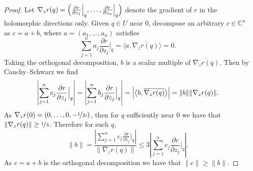 \documentclass[12pt,openany]{book}
\newcommand{\blinnprod}[2]{\bigl\langle #1 , #2 \bigr\rangle}
\newcommand{\snorm}[1]{\lVert {#1} \rVert}
\newcommand{\Babs}[1]{\Bigl\lvert {#1} \Bigr\rvert}
\newcommand{\abs}[1]{\left\lvert {#1} \right\rvert}
\newcommand{\C}{{\mathbb{C}}}
\theoremstyle{plain}
\theoremstyle{remark}
\theoremstyle{definition}
\theoremstyle{exercise}
\theoremstyle{example}
\begin{document}
\begin{proof}
Let $\nabla_z r(q) =
\Bigl(
\frac{\partial r}{\partial z_1}\Big|_q,\ldots,
\frac{\partial r}{\partial z_n}\Big|_q \Bigr)$ denote the gradient of $r$ in
the holomorphic directions only.
Given $q \in U$ near $0$,
decompose an arbitrary $c \in \C^n$ as $c = a+b$, where $a = (a_1,\ldots,a_n)$
satisfies
\begin{equation*}
\sum_{j=1}^n
a_j \frac{\partial r}{\partial z_j} \Big|_q = 
\blinnprod{a}{\overline{\nabla_z r(q)}}
=
0 .
\end{equation*}
Taking the orthogonal decomposition, $b$ is a scalar multiple of $\overline{\nabla_z r(q)}$.
Then by Cauchy--Schwarz we find
\begin{equation*}
\abs{\sum_{j=1}^n c_j \frac{\partial r}{\partial z_j} \Big|_q}
=
\abs{\sum_{j=1}^n b_j \frac{\partial r}{\partial z_j} \Big|_q}
=
\Babs{\blinnprod{b}{\overline{\nabla_z r(q)}}}
=
\snorm{b} \snorm {\nabla_z r(q)} .
\end{equation*}
As $\nabla_z r(0) = (0,\ldots,0,-\nicefrac{1}{2i})$, then for $q$ sufficiently near $0$ we have that
$\snorm{\nabla_z r(q)} \geq \nicefrac{1}{3}$.  Therefore for such $q$,
\begin{equation*}
\snorm{b} =
\frac{\abs{\sum_{j=1}^n c_j \frac{\partial r}{\partial z_j} \Big|_q}}{\snorm {\nabla_z r(q)}}
\leq
3 \abs{\sum_{j=1}^n c_j \frac{\partial r}{\partial z_j} \Big|_q}
.
\end{equation*}
As $c = a+b$ is the orthogonal decomposition we have that $\snorm{c} \geq
\snorm{b}$.


\end{proof}
\end{document}
